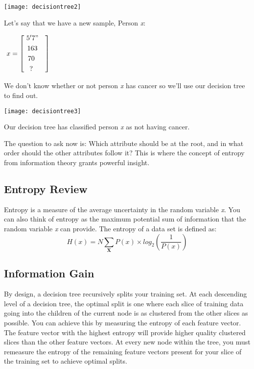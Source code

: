 \documentclass{article}
\theoremstyle{definition}
\begin{document}
\texttt{[image: decisiontree2]}

Let's say that we have a new sample, Person \textit{x}:
\begin{center}
$
 $ $ x = \begin{bmatrix}
       \ 5'7"             \\[0.3em]
       \ 163   \\[0.3em]
       70           &\\[0.3em]
       ?  &
     \end{bmatrix}$
 \end{center}
 We don't know whether or not person \textit{x} has cancer so we'll use our decision tree to find out.
     
     
\texttt{[image: decisiontree3]} 

Our decision tree has classified person \textit{x} as not having cancer.

The question to ask now is: Which attribute should be at the root, and in what order should the other attributes follow it? This is where the concept of entropy from information theory grants powerful insight.
\begin{siderules}
\subsection{Entropy Review}
Entropy is a measure of the average uncertainty in the random variable \textit{x}. You can also think of entropy as the maximum potential sum of information that the random variable 
\textit{x} can provide.\newline
The entropy of a data set is defined as: \[H(x)=N\sum_{\textbf{X}}^{}P(x)\times log_2(\frac{1}{P(x)}) \]
\end{siderules}
\subsection{Information Gain}
By design, a decision tree recursively splits your training set. At each descending level of a decision tree, the optimal split is one where each slice of training data going into the children of the current node is as clustered from the other slices as possible. You can achieve this by measuring the entropy of each feature vector. The feature vector with the highest entropy will provide higher quality clustered slices than the other feature vectors. At every new node within the tree, you must remeasure the entropy of the remaining feature vectors present for your slice of the training set to achieve optimal splits.
\end{document}
